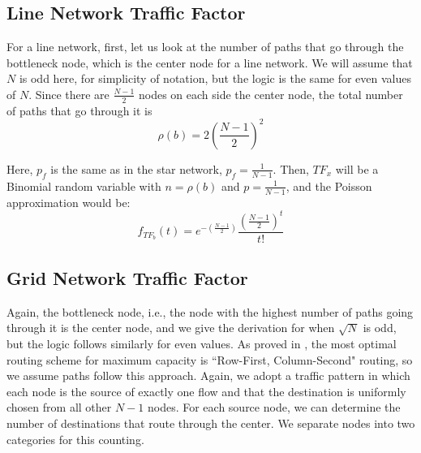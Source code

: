 \subsection{Line Network Traffic Factor}
For a line network, first, let us look at the number of paths that go through the bottleneck node, which is the center node for a line network.  We will assume that $N$ is odd here, for simplicity of notation, but the logic is the same for even values of $N$.  Since there are $\frac{N-1}{2}$ nodes on each side the center node, the total number of paths that go through it is
\begin{equation*}
	\rho(b) = 2(\frac{N-1}{2})^2
\end{equation*}

Here, $p_f$ is the same as in the star network, $p_f = \frac{1}{N-1}$.  Then, $TF_x$ will be a Binomial random variable with $n=\rho(b)$ and $p=\frac{1}{N-1}$, and the Poisson approximation would be:  
\begin{equation*}
	f_{TF_b}(t) = e^{-(\frac{N-1}{2})}\frac{(\frac{N-1}{2})^{t}}{t!}
\end{equation*} 

\subsection{Grid Network Traffic Factor}
Again, the bottleneck node, i.e., the node with the highest number of paths going through it is the center node, and we give the derivation for when $\sqrt{N}$ is odd, but the logic follows similarly for even values.  As proved in \cite{lattice_nets_cap_opt_routing}, the most optimal routing scheme for maximum capacity is ``Row-First, Column-Second" routing, so we assume paths follow this approach.  Again, we adopt a traffic pattern in which each node is the source of exactly one flow and that the destination is uniformly chosen from all other $N-1$ nodes.  
For each source node, we can determine the number of destinations that route through the center.  We separate nodes into two categories for this counting.

